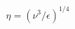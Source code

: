 \documentclass[preview]{standalone}
\begin{document}
\begin{align*}
\eta = (\nu^3 / \epsilon)^{1/4}
\end{align*}
\end{document}
